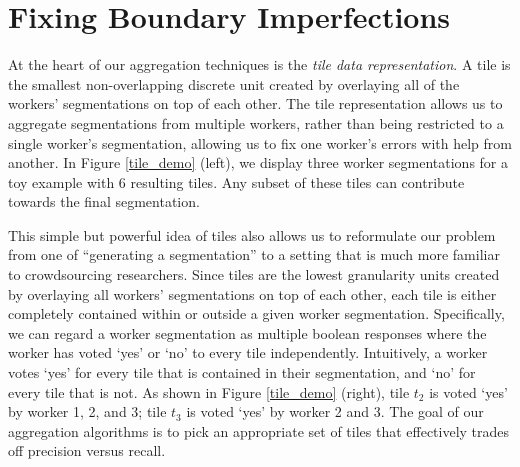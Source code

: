 \documentclass[letterpaper]{article}
\begin{document}

\section{Fixing Boundary Imperfections\label{precision}}
At the heart of our aggregation techniques is the \emph{tile data representation}. A tile is the smallest non-overlapping discrete unit created by overlaying all of the workers' segmentations on top of each other. 
The tile representation allows us to aggregate segmentations from multiple workers, rather than being restricted to a single worker's segmentation, allowing us to fix one worker's errors with help from another. In Figure \ref{tile_demo} (left), we display three worker segmentations for a toy example with 6 resulting tiles. Any subset of these tiles can contribute towards the final segmentation.
\par This simple but powerful idea of tiles also allows us to reformulate our problem from one of ``generating a segmentation'' to a setting that is much more familiar to crowdsourcing researchers. Since tiles are the lowest granularity units created by overlaying all workers' segmentations on top of each other, each tile is either completely contained within or outside a given worker segmentation. Specifically, we can regard a worker segmentation as multiple boolean responses where the worker has voted `yes' or `no' to every tile independently. Intuitively, a worker votes `yes' for every tile that is contained in their segmentation, and `no' for every tile that is not. As shown in Figure \ref{tile_demo} (right), tile $t_2$ is voted `yes' by worker 1, 2, and 3; tile $t_3$ is voted `yes' by worker 2 and 3. The goal of our aggregation algorithms is to pick an appropriate set of tiles that effectively trades off precision versus recall.
\end{document}
